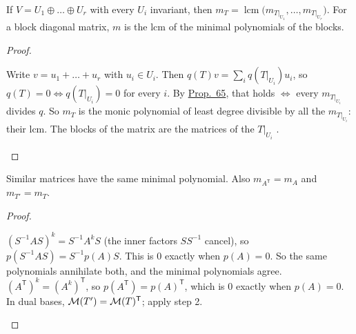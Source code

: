 \documentclass[10pt]{scrartcl}
\begin{document}
\begin{proposition*}\hypertarget{name-f4-direct-sums-block-diagonal-matrices}{}\label{name-f4-direct-sums-block-diagonal-matrices}
  If $V=U_1\oplus\dots\oplus U_r$ with every $U_i$ invariant, then $m_T=\operatorname{lcm}\bigl(m_{T|_{U_1}},\dots,m_{T|_{U_r}}\bigr)$. For a block diagonal matrix, $m$ is the lcm of the minimal polynomials of the blocks.
\end{proposition*}
\begin{proof}
  \begin{steps}
    \ii Write $v=u_1+\dots+u_r$ with $u_i\in U_i$. Then $q(T)v=\sum_iq(T|_{U_i})u_i$, so $q(T)=0\iff q(T|_{U_i})=0$ for every $i$.
    \ii By \hyperref[prop-65]{Prop.~65}, that holds $\iff$ every $m_{T|_{U_i}}$ divides $q$.
    \ii So $m_T$ is the monic polynomial of least degree divisible by all the $m_{T|_{U_i}}$: their lcm. The blocks of the matrix are the matrices of the $T|_{U_i}$ .
  \end{steps}
\end{proof}

\begin{proposition*}\hypertarget{name-f5-similarity-transpose-dual}{}\label{name-f5-similarity-transpose-dual}
  Similar matrices have the same minimal polynomial. Also $m_{A^{\mathsf T}}=m_A$ and $m_{T'}=m_T$.
\end{proposition*}
\begin{proof}
  \begin{steps}
    \ii $(S^{-1}AS)^k=S^{-1}A^kS$ (the inner factors $SS^{-1}$ cancel), so $p(S^{-1}AS)=S^{-1}p(A)S$. This is $0$ exactly when $p(A)=0$. So the same polynomials annihilate both, and the minimal polynomials agree.
    \ii $(A^{\mathsf T})^k=(A^k)^{\mathsf T}$, so $p(A^{\mathsf T})=p(A)^{\mathsf T}$, which is $0$ exactly when $p(A)=0$.
    \ii In dual bases, $\mathcal M(T')=\mathcal M(T)^{\mathsf T}$; apply step 2.
  \end{steps}
\end{proof}
\end{document}
